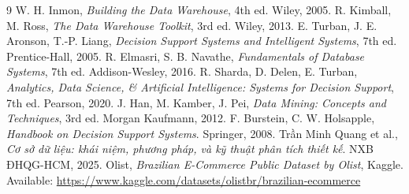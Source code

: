 \renewcommand{\refname}{Tài liệu tham khảo}
\begingroup
\sloppy
\begin{thebibliography}{9}
     W. H. Inmon, \textit{Building the Data Warehouse}, 4th ed. Wiley, 2005.
     R. Kimball, M. Ross, \textit{The Data Warehouse Toolkit}, 3rd ed. Wiley, 2013.
     E. Turban, J. E. Aronson, T.-P. Liang, \textit{Decision Support Systems and Intelligent Systems}, 7th ed. Prentice-Hall, 2005.
     R. Elmasri, S. B. Navathe, \textit{Fundamentals of Database Systems}, 7th ed. Addison-Wesley, 2016.
     R. Sharda, D. Delen, E. Turban, \textit{Analytics, Data Science, \& Artificial Intelligence: Systems for Decision Support}, 7th ed. Pearson, 2020.
     J. Han, M. Kamber, J. Pei, \textit{Data Mining: Concepts and Techniques}, 3rd ed. Morgan Kaufmann, 2012.
     F. Burstein, C. W. Holsapple, \textit{Handbook on Decision Support Systems}. Springer, 2008.
     Trần Minh Quang et al., \textit{Cơ sở dữ liệu: khái niệm, phương pháp, và kỹ thuật phân tích thiết kế}. NXB ĐHQG-HCM, 2025.
     Olist, \textit{Brazilian E-Commerce Public Dataset by Olist}, Kaggle. Available: \url{https://www.kaggle.com/datasets/olistbr/brazilian-ecommerce}
\end{thebibliography}
\endgroup

